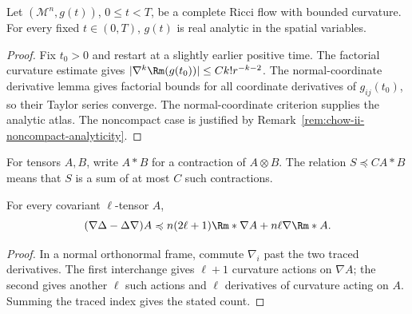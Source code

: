 \begin{theorem}
\label{thm:chow-ii-ricci-flow-spatial-real-analyticity}
Let \((\mathcal M^n,g(t))\), \(0\leq t<T\), be a complete Ricci flow with
bounded curvature.  For every fixed \(t\in(0,T)\), \(g(t)\) is real analytic
in the spatial variables.
\end{theorem}
\begin{proof}
\sketch
{}
Fix \(t_0>0\) and restart at a slightly earlier positive time.  The factorial
curvature estimate gives \(|\nabla^k\Rm(g(t_0))|\leq Ck!r^{-k-2}\).  The
normal-coordinate derivative lemma gives factorial bounds for all coordinate
derivatives of \(g_{ij}(t_0)\), so their Taylor series converge.  The
normal-coordinate criterion supplies the analytic atlas.  The noncompact
case is justified by Remark~\ref{rem:chow-ii-noncompact-analyticity}.
\end{proof}

For tensors \(A,B\), write \(A*B\) for a contraction of \(A\otimes B\).
The relation \(S\preccurlyeq C A*B\) means that \(S\) is a sum of at most
\(C\) such contractions.

\begin{lemma}
\label{lem:chow-ii-nabla-laplacian-commutator}
For every covariant \(\ell\)-tensor \(A\),
\[
 (\nabla\Delta-\Delta\nabla)A
 \preccurlyeq n(2\ell+1)\Rm*\nabla A+n\ell\nabla\Rm*A.
\]
\end{lemma}
\begin{proof}
\sketch
In a normal orthonormal frame, commute \(\nabla_i\) past the two traced
derivatives.  The first interchange gives \(\ell+1\) curvature actions on
\(\nabla A\); the second gives another \(\ell\) such actions and \(\ell\)
derivatives of curvature acting on \(A\).  Summing the traced index gives the
stated count.
\end{proof}


